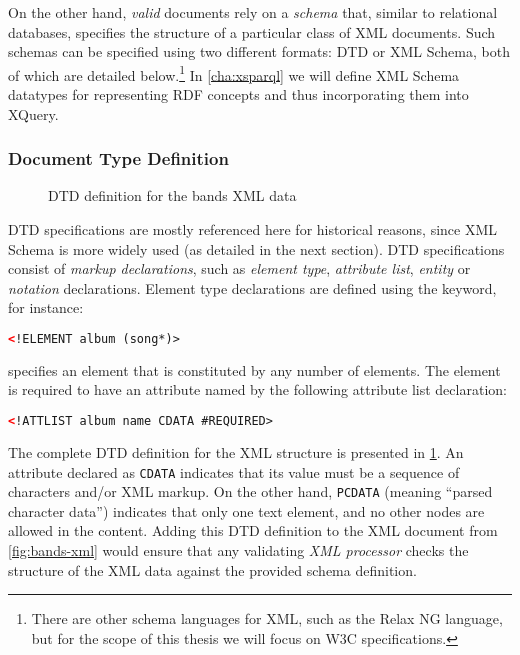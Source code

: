 On the other hand, \emph{valid} documents rely on a \emph{schema} that, similar to relational databases, specifies the
structure of a particular class of \ac{XML} documents. Such schemas can be specified using two different formats:
\ac{DTD} or \ac{XML} Schema, both of which are detailed below.\footnote{There are other schema languages for \ac{XML},
  such as the Relax NG language, but for the scope of this thesis we will focus on \ac{W3C} specifications.}
%
In \cref{cha:xsparql} we will define \ac{XML} Schema datatypes for representing \ac{RDF} concepts and thus
incorporating them into XQuery.

\subsubsection{Document Type Definition}
\label{sec:dtd}


\begin{figure}[t]
  \centering
  
  \caption{\ac{DTD} definition for the bands XML data}
\label{fig:bands-xml-dtd}
\end{figure}

\ac{DTD} specifications are mostly referenced here for historical reasons, since \ac{XML} Schema is more widely used (as
detailed in the next section).
%
\ac{DTD} specifications consist of \emph{markup declarations}, such as \emph{element type}, \emph{attribute list},
\emph{entity} or \emph{notation} declarations.  
% 
Element type declarations are defined using the  keyword, for instance:
%
\begin{lstlisting}[language=XML,basicstyle=\normalfont\ttfamily,frame=none,numbers=none]
<!ELEMENT album (song*)>
\end{lstlisting}
%
specifies an  element that is constituted by any number of  elements. The
 element is required to have an attribute named  by the following attribute list
declaration:
%
\begin{lstlisting}[language=XML,basicstyle=\normalfont\ttfamily,frame=none,numbers=none]
<!ATTLIST album name CDATA #REQUIRED>
\end{lstlisting}
%
The complete \ac{DTD} definition for the \usecase \ac{XML} structure is presented in \cref{fig:bands-xml-dtd}.  An
attribute declared as \texttt{CDATA} indicates that its value must be a sequence of characters and/or \ac{XML} markup.
%
On the other hand, \texttt{PCDATA} (meaning ``parsed character data'') indicates that only one text element, and no
other nodes are allowed in the content.
%
Adding this \ac{DTD} definition to the \ac{XML} document from \cref{fig:bands-xml} would ensure that any
validating \emph{\ac{XML} processor} checks the structure of the \ac{XML} data against the provided schema definition.
%


